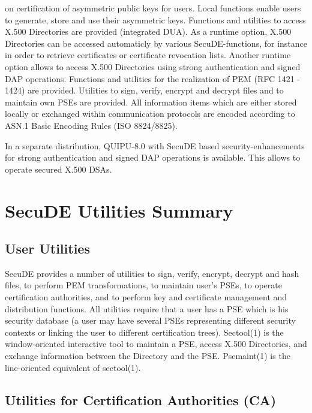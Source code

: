    on certification of asymmetric public keys for users.
   Local functions enable users to generate, store and use
   their asymmetric keys.
\m Functions and utilities to access X.500 Directories are provided
   (integrated DUA). As a runtime option, X.500 Directories can be
   accessed automaticly by various SecuDE-functions, for instance in 
   order to retrieve certificates or certificate revocation lists. Another
   runtime option allows to access X.500 Directories using strong
   authentication and signed DAP operations.
\m Functions and utilities for the realization of PEM (RFC 1421 - 1424)
   are provided.
\m Utilities to sign, verify, encrypt and decrypt files and to maintain 
   own PSEs are provided.
\ee
All information items which are either stored locally or exchanged
within communication protocols are encoded according to ASN.1 Basic
Encoding Rules (ISO 8824/8825). 

In a separate distribution, QUIPU-8.0 with SecuDE based 
security-enhancements for strong authentication and signed DAP operations is available. This allows to operate secured X.500 DSAs.

\section{SecuDE Utilities Summary}
\pagestyle{myheadings}


\subsection{User Utilities}

SecuDE provides a number of utilities to sign, verify, encrypt, decrypt 
and hash files, to perform PEM transformations, to maintain user's PSEs, to
operate certification authorities, and to perform key and certificate
management and distribution functions. All utilities require that
a user has a PSE which is his security database (a user may have
several PSEs representing different security contexts or linking
the user to different certification trees). Sectool(1) is the window-oriented
interactive tool to maintain a PSE, access X.500 Directories, and
exchange information between the Directory and the PSE.
Psemaint(1) is the line-oriented equivalent of sectool(1).   

\subsection{Utilities for Certification Authorities (CA)}
 
